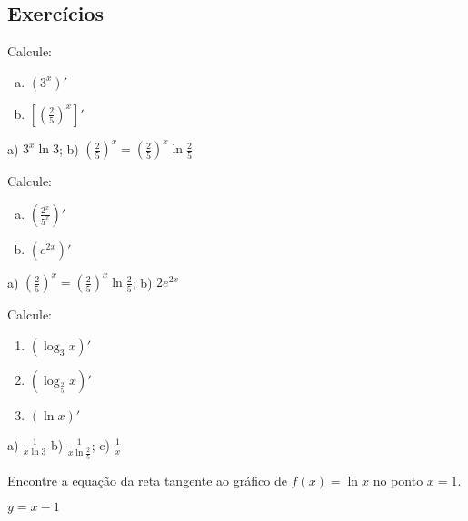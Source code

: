 \subsection{Exercícios}

\begin{exer}
  Calcule:
  \begin{enumerate}[a)]
  \item $\displaystyle \left(3^x\right)'$
  \item $\displaystyle \left[\left(\frac{2}{5}\right)^x\right]'$
  \end{enumerate}
\end{exer}
\begin{resp}
  a) $3^x\ln 3$; b) $\left(\frac{2}{5}\right)^x = \left(\frac{2}{5}\right)^x\ln\frac{2}{5}$
\end{resp}

\begin{exer}
  Calcule:
  \begin{enumerate}[a)]
  \item $\displaystyle \left(\frac{2^x}{5^x}\right)'$\\
  \item $\displaystyle \left(e^{2x}\right)'$
  \end{enumerate}
\end{exer}
\begin{resp}
  a) $\left(\frac{2}{5}\right)^x = \left(\frac{2}{5}\right)^x\ln\frac{2}{5}$; b) $2e^{2x}$
\end{resp}

\begin{exer}
  Calcule:
  \begin{enumerate}
  \item $\displaystyle\left(\log_3 x\right)'$
  \item $\displaystyle\left(\log_{\frac{2}{5}} x\right)'$
  \item $\displaystyle (\ln x)'$
  \end{enumerate}
\end{exer}
\begin{resp}
  a) $\displaystyle \frac{1}{x\ln 3}$ b) $\displaystyle\frac{1}{x\ln \frac{2}{5}}$; c) $\frac{1}{x}$
\end{resp}

\begin{exer}
  Encontre a equação da reta tangente ao gráfico de $f(x) = \ln x$ no ponto $x=1$.
\end{exer}
\begin{resp}
  $y = x-1$
\end{resp}

